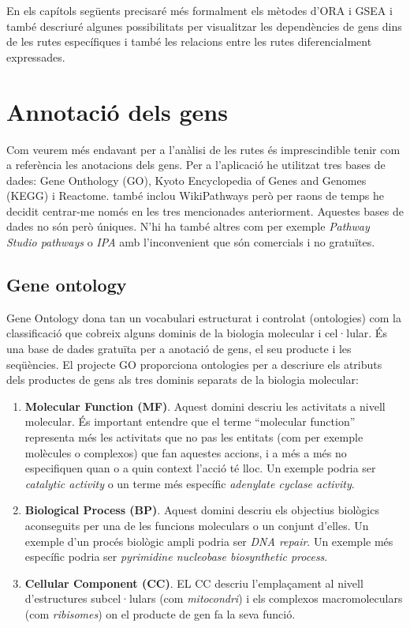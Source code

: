 \begin{itemize}
En els capítols següents precisaré més formalment els mètodes d'\gls{ORA} i \gls{GSEA} i també descriuré algunes possibilitats per visualitzar les dependències de gens dins de les rutes específiques i també les relacions entre les rutes diferencialment expressades.

\end{itemize}


\section{Annotació dels gens}

Com veurem més endavant per a l’anàlisi de les rutes és imprescindible tenir com a referència les anotacions dels gens. Per a l’aplicació he utilitzat tres bases de dades: Gene Onthology (GO), Kyoto Encyclopedia of Genes and Genomes (KEGG) i Reactome.  també inclou WikiPathways però per raons de temps he decidit centrar-me només en les tres mencionades anteriorment. Aquestes bases de dades no són però úniques. N'hi ha també altres com per exemple \textit{Pathway Studio pathways} o \textit{IPA} amb l’inconvenient que són comercials i no gratuïtes. 

\subsection{Gene ontology}
Gene Ontology \cite{gene2004gene} dona tan un vocabulari estructurat i controlat (ontologies) com la classificació que cobreix alguns dominis de la biologia molecular i cel·lular. És una base de dades gratuïta per a anotació de gens, el seu producte i les seqüències. El projecte \gls{GO} proporciona ontologies per a descriure els atributs dels productes de gens als tres dominis separats de la biologia molecular:
\begin{enumerate}
\item \textbf{Molecular Function (MF)}. Aquest domini descriu les activitats a nivell molecular. És important entendre que el terme ``molecular function'' representa més les activitats que no pas les entitats (com per exemple molècules o complexos) que fan aquestes accions, i a més a més no especifiquen quan o a quin context l'acció té lloc. Un exemple podria ser \textit{catalytic activity} o un terme més específic \textit{adenylate cyclase activity}.
\item \textbf{Biological Process (BP)}. Aquest domini descriu els objectius biològics aconseguits per una de les funcions moleculars o un conjunt d’elles. Un exemple d'un procés biològic ampli podria ser \textit{DNA repair}. Un exemple més específic podria ser \textit{pyrimidine nucleobase biosynthetic process}. 
\item \textbf{Cellular Component (CC)}. EL CC descriu l'emplaçament al nivell d'estructures subcel·lulars (com \textit{mitocondri}) i els complexos macromoleculars (com \textit{ribisomes}) on el producte de gen fa la seva funció.
\end{enumerate}

